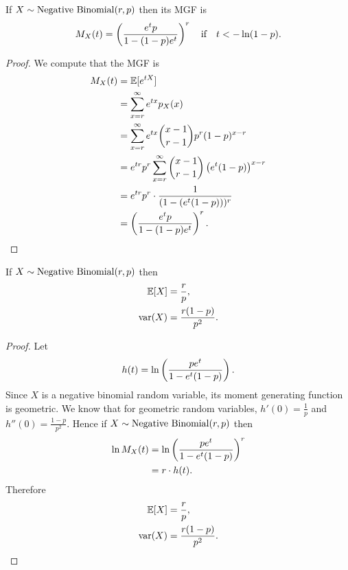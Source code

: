 \documentclass[class=article, crop=false]{standalone}
\begin{document}
  \begin{theorem}{}
    If $X\sim \operatorname{Negative\ Binomial}(r, p)$ then its MGF is
    \[
      M_X(t) = \left( \frac{e^tp}{1 - (1 - p)e^t} \right)^r\quad\text{if}\quad t < -\ln(1 - p).
    \]
    \begin{proof}
      We compute that the MGF is
      \begin{align*}
        M_X(t) &= \mathbb{E}[e^{tX}] \\
               &= \sum_{x=r}^{\infty} e^{tx}p_X(x) \\
               &= \sum_{x=r}^{\infty} e^{tx}\binom{x - 1}{r - 1}p^r(1 - p)^{x - r} \\
               &= e^{tr}p^r \sum_{x=r}^{\infty} \binom{x - 1}{r - 1}\left( e^t(1 - p) \right)^{x - r} \\
               &= e^{tr}p^r\cdot \frac{1}{(1 - (e^t(1 - p)))^r} \\
               &= \left( \frac{e^tp}{1 - (1 - p)e^t} \right)^r.
      \end{align*}
    \end{proof}
  \end{theorem}
  \begin{theorem}{}
    If $X\sim \operatorname{Negative\ Binomial}(r, p)$ then
    \begin{align*}
      \mathbb{E}[X] &= \frac{r}{p}, \\
      \operatorname{var}(X) &= \frac{r(1 - p)}{p^2}.
    \end{align*}
    \begin{proof}
      Let
      \[
        h(t) = \ln \left( \frac{pe^t}{1 - e^t(1 - p)} \right).
      \]
      Since $X$ is a negative binomial random variable, its moment generating function is geometric. We know that for geometric random variables, $h'(0) = \frac{1}{p}$ and $h''(0) = \frac{1 - p}{p^2}$. Hence if $X\sim \operatorname{Negative\ Binomial}(r, p)$ then
      \begin{align*}
        \ln M_X(t) &= \ln \left( \frac{pe^t}{1 - e^t(1 - p)} \right)^r \\
                   &= r\cdot h(t).
      \end{align*}
      Therefore
      \begin{align*}
        \mathbb{E}[X] &= \frac{r}{p}, \\
        \operatorname{var}(X) &= \frac{r(1 - p)}{p^2}.
      \end{align*}
    \end{proof}
  \end{theorem}
\end{document}
